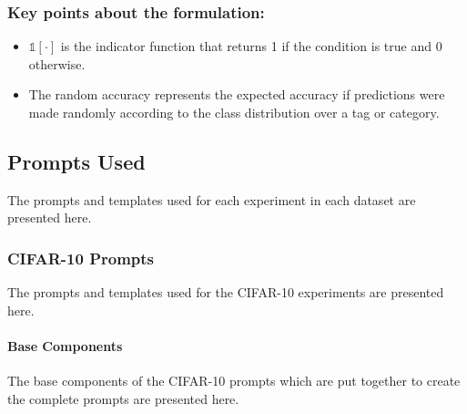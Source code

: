\documentclass[../ShajiS_RnDReport.tex]{subfiles}
\begin{document}
\subsubsection{Key points about the formulation:}
\begin{itemize}
    \item $\mathbb{1}[\cdot]$ is the indicator function that returns 1 if the condition is true and 0 otherwise.
    \item The random accuracy represents the expected accuracy if predictions were made randomly according to the class distribution over a tag or category.
\end{itemize}


\subsection{Prompts Used}
\label{sec:appendix:prompts}
The prompts and templates used for each experiment in each dataset are presented here.

\subsubsection{CIFAR-10 Prompts}
\label{sec:appendix:prompts:cifar}
The prompts and templates used for the CIFAR-10 experiments are presented here.

\paragraph{Base Components}
\label{sec:appendix:prompts:cifar:base}
The base components of the CIFAR-10 prompts which are put together to create the complete prompts are presented here.
\end{document}
